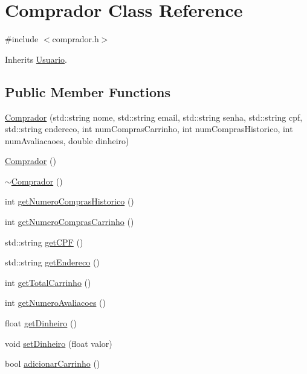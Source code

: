 \hypertarget{class_comprador}{}\section{Comprador Class Reference}
\label{class_comprador}


{\ttfamily \#include $<$comprador.\+h$>$}



Inherits \hyperlink{class_usuario}{Usuario}.

\subsection*{Public Member Functions}
\begin{DoxyCompactItemize}
\item 
\hyperlink{class_comprador_aa8494892432d46b4c8825a5b435af44d}{Comprador} (std\+::string nome, std\+::string email, std\+::string senha, std\+::string cpf, std\+::string endereco, int num\+Compras\+Carrinho, int num\+Compras\+Historico, int num\+Avaliacaoes, double dinheiro)
\item 
\hyperlink{class_comprador_a83fc25fdd74fceee73944bfe801ebe08}{Comprador} ()
\item 
\hyperlink{class_comprador_a1531e2981ee8279bfc273d28a84c1e32}{$\sim$\+Comprador} ()
\item 
int \hyperlink{class_comprador_a18e5782aa451203303ebc3f1ff924f4e}{get\+Numero\+Compras\+Historico} ()
\item 
int \hyperlink{class_comprador_a492e697b6237f13d80ff3f6f0b65796e}{get\+Numero\+Compras\+Carrinho} ()
\item 
std\+::string \hyperlink{class_comprador_aeb955f1d7fb934cc4e5ffe85d1f5b1f1}{get\+C\+PF} ()
\item 
std\+::string \hyperlink{class_comprador_a590eb62bff00484b051e13261d050e83}{get\+Endereco} ()
\item 
int \hyperlink{class_comprador_aaff2a1d0fb260e9688367eb606c4eeb5}{get\+Total\+Carrinho} ()
\item 
int \hyperlink{class_comprador_ab17a4464ac51d495b7751fd5ced81005}{get\+Numero\+Avaliacoes} ()
\item 
float \hyperlink{class_comprador_a92c4ce72febc0bdddc9a709f26656729}{get\+Dinheiro} ()
\item 
void \hyperlink{class_comprador_a4f22858b4fdd931a81dd8cfcd4783bde}{set\+Dinheiro} (float valor)
\item 
bool \hyperlink{class_comprador_a321ef648a886ea8c567c5030e6ea1e65}{adicionar\+Carrinho} ()

\end{DoxyCompactItemize}
